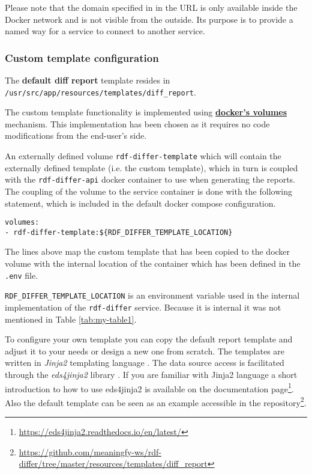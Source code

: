 	Please note that the domain specified in in the URL is only available inside the Docker network and is not visible from the outside. Its purpose is to provide a named way for a service to connect to another service. 

		\subsubsection{Custom template configuration}
		\label{sec:rdf-differ-ct}
		The \textbf{default diff report} template resides in \\ \texttt{/usr/src/app/resources/templates/diff\_report}.

		The custom template functionality is implemented using \textbf{\href{https://docs.docker.com/storage/volumes/}{docker's volumes}} mechanism. This implementation has been chosen as it requires no code modifications from the end-user's side.
		
		An externally defined volume \texttt{rdf-differ-template} which will contain the externally defined template (i.e. the custom template), which in turn is coupled with the \texttt{rdf-differ-api} docker container to use when generating the reports. The coupling of the volume to the service container is done with the following statement, which is included in the default docker compose configuration. 

		\begin{lstlisting}[]
volumes:
- rdf-differ-template:${RDF_DIFFER_TEMPLATE_LOCATION}
		\end{lstlisting}

		The lines above map the custom template that has been copied to the docker volume with the internal location of the container which has been defined in the \texttt{.env} file.
		
		\texttt{RDF\_DIFFER\_TEMPLATE\_LOCATION} is an environment variable used in the internal implementation of the \texttt{rdf-differ} service. Because it is internal it was not mentioned in Table \ref{tab:my-table1}.
		
		To configure your own template you can copy the default report template and adjust it to your needs or design a new one from scratch. 
		The templates are written in \textit{Jinja2} templating language \citep{jinja2}. The data source access is facilitated through the \textit{eds4jinja2} library \citep{eds4jinja2}. If you are familiar with Jinja2 language a short introduction to how to use eds4jinja2 is available on the documentation page\footnote{\url{https://eds4jinja2.readthedocs.io/en/latest/}}. Also the default template can be seen as an example accessible in the repository\footnote{\url{https://github.com/meaningfy-ws/rdf-differ/tree/master/resources/templates/diff_report}}.
		 
